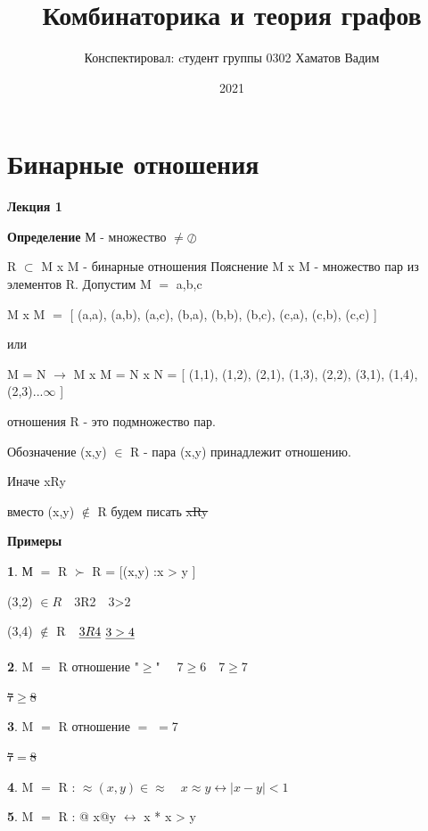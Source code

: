\documentclass{article}
\title{Комбинаторика и теория графов}
\date{2021}
\author{Конспектировал: cтудент группы 0302 Хаматов Вадим}
\begin{document}
\maketitle
\begin{center}
		\tableofcontents
	\end{center}

\section{Бинарные отношения}

\textbf{Лекция 1}

\textbf{Определение} М - множество $\neq \oslash$

    R $\subset$ M x M - бинарные отношения
Пояснение
    M x M - множество пар из элементов R.
Допустим M $=$ { a,b,c }

    M x M $=$ [ (a,a), (a,b), (a,c), (b,a), (b,b), (b,c), (c,a), (c,b), (c,c) ] 
    
    или
    
    M = N $\rightarrow$ M x M = N x N = [ (1,1), (1,2), (2,1), (1,3), (2,2), (3,1), (1,4), (2,3)...$\infty$ ]
    
    отношения R - это подмножество пар.
    
    Обозначение (x,y) $\in$ R - пара (x,y) принадлежит отношению.
    
    Иначе xRy
    
    вместо (x,y) $\notin$ R будем писать \sout{xRy}
    
    \textbf{Примеры}
    
    \textbf{1}. М $=$ R $\succ$ R = [(x,y) :x > y ]

    (3,2) $\in{R}$  $ $ $ $ 3R2 $ $ $ $   3>2

    (3,4) $\notin$ R $ $ $ $  $\sout{3R4 }$ \quad \quad  $\sout{3>4}$


    \textbf{2}. M $=$ R отношение "$\geq$" $ $ $ $ $ $  7$\geq$6 $ $ $ $ 7$\geq$7 
    
    \qquad \qquad  \qquad  \qquad  \qquad  \quad \qquad  \sout{7$\geq$8} 
    
    
    \textbf{3}. M $=$ R отношение $=$ $=$7

\qquad \qquad  \qquad  \qquad  \qquad  \quad \qquad  \sout{7$=$8} 

    \textbf{4}. M $=$ R : $\approx (x,y) \in \approx \quad x \approx y \leftrightarrow |x - y| < 1$
    
    \textbf{5}. M $=$ R : @ x@y $\leftrightarrow$ x * x > y
    
\end{document}
